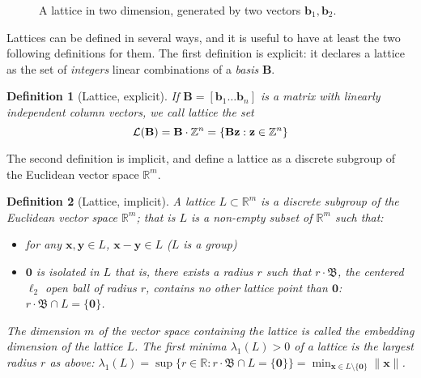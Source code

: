 \documentclass[12pt]{article}
\renewcommand{\vec}{\mathbf}
\newcommand{\Z}{\mathbb Z}
\newcommand{\R}{\mathbb R}
\newcommand{\Ball}{\mathfrak B}
\newcommand{\norm}[1]{\|#1\|}
\newtheorem{definition}{Definition}{\bfseries}{\upshape}
\begin{document}
\begin{figure}
\caption{A lattice in two dimension, generated by two vectors $\vec b_1, \vec b_2$.}
\label{fig:lattice}
\begin{center}
\end{center}
\end{figure}

Lattices can be defined in several ways, and it is useful to have at least the two following definitions for them. The first definition is explicit: it declares a lattice as the set of {\em integers} linear combinations of a {\em basis} $\vec B$.


\begin{definition}[Lattice, explicit]
If $\vec B = [\vec b_1 \dots \vec b_n ]$ is a matrix with linearly independent column vectors, we call lattice the set \[  \cL(\vec B) = \vec B \cdot \Z^n = \{\vec B \vec z : \vec z \in \Z^n\} \]
\end{definition}

The second definition is implicit, and define a lattice as a discrete subgroup of the Euclidean vector space $\R^m$.

\begin{definition}[Lattice, implicit]
A lattice $L \subset \R^m$ is a discrete subgroup of the Euclidean vector space $\R^m$; that is
$L$ is a non-empty subset of $\R^m$ such that:
\begin{itemize}
\item for any $\vec x,\vec y \in L$, $\vec x - \vec y \in L$ ($L$ is a group)
\item $\vec 0$ is isolated in $L$ that is, there exists a radius $r$ such that $r \cdot \Ball$, 
the centered $\ell_2$ open ball of radius $r$, contains no other lattice point than $\vec 0$: $r \cdot \Ball \cap L = \{ \vec 0 \}$.
\end{itemize}
The dimension $m$ of the vector space containing the lattice is called the embedding dimension of the lattice $L$.
The first minima $\lambda_1(L) > 0 $ of a lattice is the largest radius $r$ as above:
 $\lambda_1(L) = \sup \{r\in \R : r \cdot \Ball \cap L = \{ \vec 0 \}\} = \min_{\vec x \in L\setminus \{\vec 0\}} \norm{\vec x}$.
\end{definition}
\end{document}
